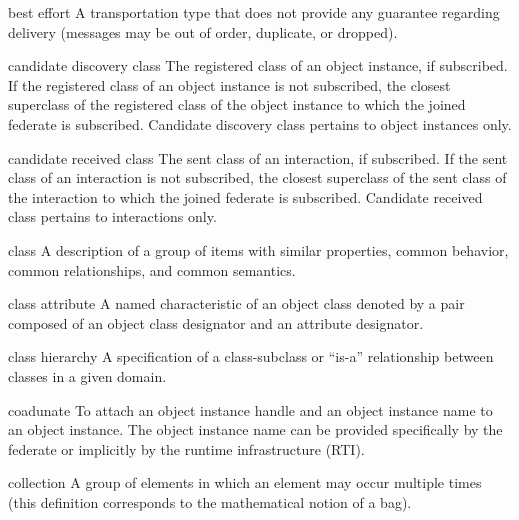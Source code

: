 \begin{definition}{best effort}
    A transportation type that does not provide any guarantee regarding delivery (messages may be out of order, duplicate, or dropped).
\end{definition}

\begin{definition}{candidate discovery class}
    The registered class of an object instance, if subscribed. If the registered class of an object instance is not subscribed, the closest superclass of the registered class of the object instance to which the joined federate is subscribed. Candidate discovery class pertains to object instances only.
\end{definition}

\begin{definition}{candidate received class}
    The sent class of an interaction, if subscribed. If the sent class of an interaction is not subscribed, the closest superclass of the sent class of the interaction to which the joined federate is subscribed. Candidate received class pertains to interactions only.
\end{definition}

\begin{definition}{class}
    A description of a group of items with similar properties, common behavior, common relationships, and common semantics.
\end{definition}

\begin{definition}{class attribute}
    A named characteristic of an object class denoted by a pair composed of an object class designator and an attribute designator.
\end{definition}

\begin{definition}{class hierarchy}
    A specification of a class-subclass or ``is-a'' relationship between classes in a given domain.
\end{definition}

\begin{definition}{coadunate}
    To attach an object instance handle and an object instance name to an object instance. The object instance name can be provided specifically by the federate or implicitly by the runtime infrastructure (RTI).
\end{definition}

\begin{definition}{collection}
    A group of elements in which an element may occur multiple times (this definition corresponds to the mathematical notion of a bag).
\end{definition}

